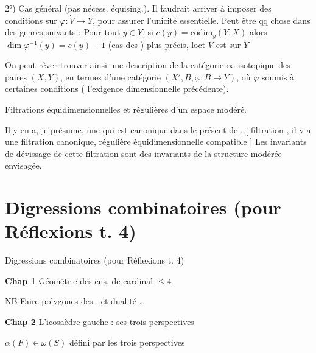 \documentclass[11pt,a4paper]{article}
\begin{document}

2°) Cas général (pas nécess. équising.). Il faudrait arriver à imposer des conditions \ill{} sur $\varphi : \dot V \to Y$, pour assurer l'unicité essentielle. Peut être qq chose dans des genres suivants : Pour tout $y \in Y$, si $c(y) = \mathrm{codim}_y(Y, X)$ alors $\dim \varphi^{-1}(y) = c(y) - 1$ (cas des ) plus précis, loct \struck{\ill{}} $\dot V$ est \ill{} sur $Y$

On peut rêver trouver ainsi une description de la catégorie $\infty$-isotopique des paires  $(X, Y)$, en termes d'une catégorie $(X', B, \varphi : B \to Y)$, où $\varphi$  soumis à certaines conditions (  l'exigence dimensionnelle précédente).


Filtrations équidimensionnelles et régulières d'un espace modéré.

Il y en a, je présume, une qui est canonique dans le présent \ill{} de . [  \struck{\ill{}} filtration \ill{} \ill{}, il y a une filtration \struck{\ill{}} canonique, régulière équidimensionnelle compatible \ill{} ] Les invariants de dévissage de cette filtration sont des invariants de la structure modérée envisagée.

\section{Digressions combinatoires (pour Réflexions t. 4)}


Digressions combinatoires (pour Réflexions t. 4)

\textbf{Chap 1} Géométrie des ens. de cardinal $\leqslant 4$

\quad NB Faire polygones des , et dualité  …

\textbf{Chap 2} L'icosaèdre gauche : ses trois \struck{\ill{}} perspectives

\quad {} $\alpha(F) \in \omega(S)$ défini par les trois perspectives
\end{document}
